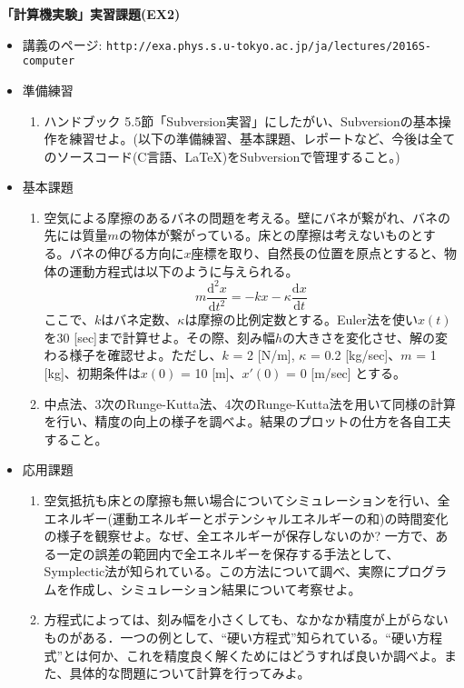 \documentclass[11pt]{jarticle}
\begin{document}
\noindent
{\bf\large 「計算機実験」実習課題(EX2)}
\\[-0.5em]

\noindent
\begin{itemize}
\item 講義のページ: \verb+http://exa.phys.s.u-tokyo.ac.jp/ja/lectures/2016S-computer+

\item 準備練習
  \begin{enumerate}
  \item ハンドブック 5.5節「Subversion実習」にしたがい、Subversionの基本操作を練習せよ。(以下の準備練習、基本課題、レポートなど、今後は全てのソースコード(C言語、\LaTeX)をSubversionで管理すること。)
  \end{enumerate}

\item 基本課題
  \begin{enumerate}
  \item 空気による摩擦のあるバネの問題を考える。壁にバネが繋がれ、バネの先には質量$m$の物体が繋がっている。床との摩擦は考えないものとする。バネの伸びる方向に$x$座標を取り、自然長の位置を原点とすると、物体の運動方程式は以下のように与えられる。
\[
 m\frac{\mathrm{d} ^2x}{\mathrm{d} t^2} = -kx - \kappa \frac{\mathrm{d} x}{\mathrm{d} t} 
\]
ここで、$k$はバネ定数、$\kappa$は摩擦の比例定数とする。Euler法を使い$x(t)$を30 [sec]まで計算せよ。その際、刻み幅$h$の大きさを変化させ、解の変わる様子を確認せよ。ただし、$k$ = 2 [N/m], $\kappa$ = 0.2 [kg/sec]、$m$ = 1 [kg]、初期条件は$x(0)$ = 10 [m]、$x'(0)$ = 0 [m/sec] とする。
\item 中点法、3次のRunge-Kutta法、4次のRunge-Kutta法を用いて同様の計算を行い、精度の向上の様子を調べよ。結果のプロットの仕方を各自工夫すること。
  \end{enumerate}
  
\item 応用課題
  \begin{enumerate}
  \item 空気抵抗も床との摩擦も無い場合についてシミュレーションを行い、全エネルギー(運動エネルギーとポテンシャルエネルギーの和)の時間変化の様子を観察せよ。なぜ、全エネルギーが保存しないのか? 一方で、ある一定の誤差の範囲内で全エネルギーを保存する手法として、Symplectic法が知られている。この方法について調べ、実際にプログラムを作成し、シミュレーション結果について考察せよ。
  \item 方程式によっては、刻み幅を小さくしても、なかなか精度が上がらないものがある．一つの例として、``硬い方程式''知られている。``硬い方程式''とは何か、これを精度良く解くためにはどうすれば良いか調べよ。また、具体的な問題について計算を行ってみよ。
  \end{enumerate}  
\end{itemize}
\end{document}
